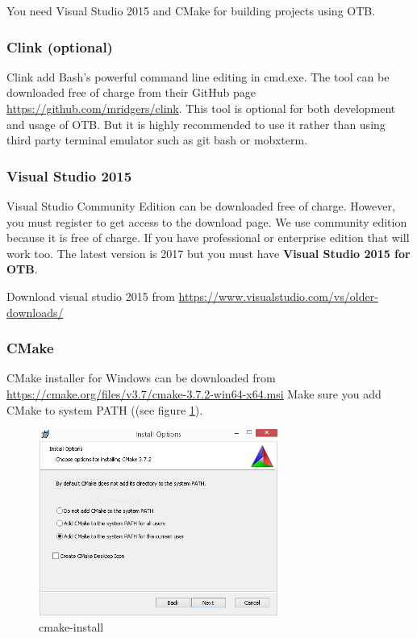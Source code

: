 \documentclass[10pt,a4paper]{article}
\begin{document}
You need Visual Studio 2015 and CMake for building projects using OTB.

\subsubsection{Clink (optional)}
Clink add Bash's powerful command line editing in
cmd.exe. The tool can be downloaded free of charge from their GitHub
page \url{https://github.com/mridgers/clink}. This tool is optional for both development and usage of OTB.
But it is highly recommended to use it rather than using third party terminal emulator such as git bash or
mobxterm.

\subsubsection{Visual Studio 2015}
Visual Studio Community Edition can be downloaded free of charge. However, you must register
to get access to the download page. We use community edition because it is free
of charge. If you have professional or enterprise edition that will work
too. The latest version is 2017 but you must have \textbf{Visual Studio 2015 for OTB}. 

Download visual studio 2015 from \url{https://www.visualstudio.com/vs/older-downloads/}

\subsubsection{CMake}
CMake installer for Windows can be downloaded from \url{https://cmake.org/files/v3.7/cmake-3.7.2-win64-x64.msi}
\newline
Make sure you add CMake to system PATH ((see figure \ref{fig:cmake-install}).

\begin{figure}[!htbp]
  \center
  \includegraphics[width=0.7\textwidth]{Art/cmake-install.png}
  \caption[]{cmake-install}
  \label{fig:cmake-install}
\end{figure}
\end{document}
